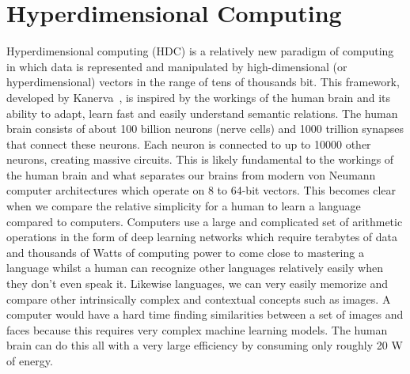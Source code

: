 \chapter[Hyperdimensional computing]{Hyperdimensional Computing}
Hyperdimensional computing (HDC) is a relatively new paradigm of computing in which data is represented and manipulated by high-dimensional (or hyperdimensional) vectors in the range of tens of thousands bit. This framework, developed by Kanerva~\cite{Kanerva2009}, is inspired by the workings of the human brain and its ability to adapt, learn fast and easily understand semantic relations. The human brain consists of about 100 billion neurons (nerve cells) and 1000 trillion synapses that connect these neurons. Each neuron is connected to up to 10000 other neurons, creating massive circuits. This is likely fundamental to the workings of the human brain and what separates our brains from modern von Neumann computer architectures which operate on 8 to 64-bit vectors. This becomes clear when we compare the relative simplicity for a human to learn a language compared to computers. Computers use a large and complicated set of arithmetic operations in the form of deep learning networks which require terabytes of data and thousands of Watts of computing power to come close to mastering a language whilst a human can recognize other languages relatively easily when they don't even speak it. Likewise languages, we can very easily memorize and compare other intrinsically complex and contextual concepts such as images. A computer would have a hard time finding similarities between a set of images and faces because this requires very complex machine learning models. The human brain can do this all with a very large efficiency by consuming only roughly 20 W of energy.

